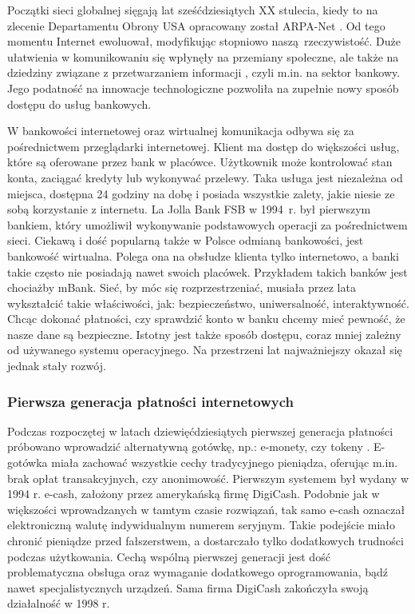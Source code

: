 Początki sieci globalnej sięgają lat sześćdziesiątych XX stulecia, kiedy to na 
zlecenie Departamentu Obrony USA opracowany został ARPA-Net 
\cite{pieniadz_elektroniczny-analiza}. Od tego momentu Internet ewoluował, 
modyfikując stopniowo naszą rzeczywistość. Duże ułatwienia w komunikowaniu się 
wpłynęły na przemiany społeczne, ale także na dziedziny związane z przetwarzaniem informacji 
\cite{pieniadz_elektroniczny-analiza}, czyli m.in. na sektor bankowy. Jego 
podatność na innowacje technologiczne pozwoliła na zupełnie nowy sposób dostępu 
do usług bankowych.

W bankowości internetowej oraz wirtualnej komunikacja odbywa się za 
pośrednictwem przeglądarki internetowej. Klient ma dostęp do większości usług, które są 
oferowane przez bank w placówce. Użytkownik może kontrolować stan konta, 
zaciągać kredyty lub wykonywać przelewy. Taka usługa jest 
niezależna od miejsca, dostępna 24 godziny na dobę i posiada wszystkie zalety, jakie 
niesie ze sobą korzystanie z internetu. La Jolla Bank FSB w 1994~r. był 
pierwszym bankiem, który umożliwił wykonywanie podstawowych operacji za 
pośrednictwem sieci. Ciekawą i dość popularną także w Polsce odmianą 
bankowości, jest bankowość wirtualna. Polega ona na obsłudze klienta tylko 
internetowo, a banki takie często nie posiadają nawet swoich placówek. 
Przykładem takich banków jest chociażby mBank. 
Sieć, by móc się rozprzestrzeniać, musiała przez lata wykształcić takie 
właściwości, jak: bezpieczeństwo, uniwersalność, interaktywność. Chcąc dokonać 
płatności, czy sprawdzić konto w banku chcemy mieć pewność, że nasze dane są 
bezpieczne. Istotny jest także sposób dostępu, coraz mniej zależny od używanego 
systemu operacyjnego. Na przestrzeni lat najważniejszy okazał się jednak stały 
rozwój. 
\subsubsection*{Pierwsza generacja płatności internetowych}

Podczas rozpoczętej w latach dziewięćdziesiątych pierwszej generacja płatności próbowano
wprowadzić alternatywną gotówkę, np.: e-monety, czy tokeny 
\cite{elektroniczne_metody_platnosci}. E-gotówka miała zachować wszystkie cechy 
tradycyjnego pieniądza, oferując m.in. brak opłat transakcyjnych, czy 
anonimowość. Pierwszym systemem był wydany w 1994 r. e-cash, założony przez 
amerykańską firmę DigiCash. Podobnie jak w większości wprowadzanych w tamtym 
czasie rozwiązań, tak samo e-cash oznaczał elektroniczną walutę indywidualnym 
numerem seryjnym. Takie podejście miało chronić pieniądze przed fałszerstwem, a 
dostarczało tylko dodatkowych trudności podczas użytkowania. Cechą wspólną pierwszej generacji jest 
dość problematyczna obsługa oraz wymaganie dodatkowego oprogramowania, bądź 
nawet specjalistycznych urządzeń. Sama firma DigiCash zakończyła swoją działalność w 1998 r.

